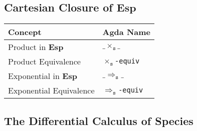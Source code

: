 \documentclass[12pt, parskip, DIV=14]{scrbook}
\newcommand{\Esp}{\mathbf{Esp}}
\begin{document}
\subsection{Cartesian Closure of $\Esp$}

\begin{center}
\begin{tabular}{ll}
  Concept & Agda Name \\
  \hline
  Product in $\Esp$ & $\_\times_\texttt{s}\_$ \\
  Product Equivalence & \texttt{$\times_\texttt{s}$-equiv} \\
  Exponential in $\Esp$ & $\_\Rightarrow_\texttt{s}\_$ \\
  Exponential Equivalence & \texttt{$\Rightarrow_\texttt{s}$-equiv} \\
\end{tabular}
\end{center}

\subsection{The Differential Calculus of Species}
\end{document}
